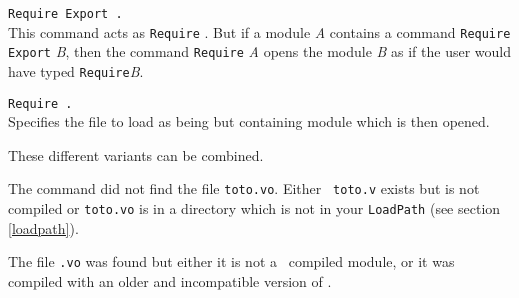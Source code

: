\begin{Variants}
\item {\tt Require Export {\qualid}.}\\
  This command acts as {\tt Require} {\qualid}.  But if a module {\it
    A} contains a command {\tt Require Export} {\it B}, then the
  command {\tt Require} {\it A} opens the module {\it B} as if the
  user would have typed {\tt Require}{\it B}.

\item {\tt Require {\qualid} {\str}.}\\ 
  Specifies the file to load as being {\str} but containing module
  {\qualid} which is then opened.
\end{Variants}

These different variants can be combined.

\begin{ErrMsgs}

\item {}

\item {}

  The command did not find the file {\tt toto.vo}. Either {\tt
    toto.v} exists but is not compiled or {\tt toto.vo} is in a directory
  which is not in your {\tt LoadPath} (see section \ref{loadpath}).

\item {}

  The file {\tt{\ident}.vo} was found but either it is not a \Coq\
  compiled module, or it was compiled with an older and incompatible
  version of \Coq.
\end{ErrMsgs}

